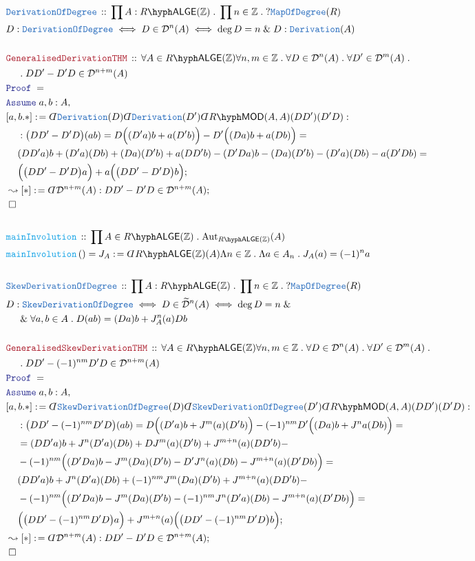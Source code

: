 \documentclass[12pt]{scrartcl}%
\newcommand{\TYPE}[1]{\textcolor{NavyBlue}{\mathtt{#1}}}%
\newcommand{\FUNC}[1]{\textcolor{Cerulean}{\mathtt{#1}}}%
\newcommand{\LOGIC}[1]{\textcolor{Blue}{\mathtt{#1}}}%
\newcommand{\THM}[1]{\textcolor{Maroon}{\mathtt{#1}}}%
\renewcommand{\.}{\; . \;} %
\newcommand{\de}{: \kern 0.1pc =} %
\newcommand{\Act}[1]{\left( #1 \right)} %
\newcommand{\Theorem}[2]{& \THM{#1} \, :: \, #2 \\ & \Proof = \\ } %
\newcommand{\DeclareType}[2]{& \TYPE{#1} \, :: \, #2 \\}%
\newcommand{\DefineNamedType}[4]{& #1 : \TYPE{#2} \iff #3 \iff #4 \\}%
\newcommand{\DeclareFunc}[2]{& \FUNC{#1} \, :: \, #2 \\}%
\newcommand{\DefineNamedFunc}[4]{&  \FUNC{#1}\Act{#2} = #3 \de #4 \\}%
\newcommand{\NewLine}{\\ & \kern 1pc}%
\newcommand{\Page}[1]{ \begin{align*} #1 \end{align*}  }%
\newcommand{ \bd }{ \ByDef }%
\renewcommand{\And}{\; \& \;}%
\newcommand{\Int}{\mathbb{Z}}%
\newcommand{\Aut}{\mathrm{Aut}}%
\newcommand{\Conclude}[3]{& #1 \de #2 : #3; \\}%
\newcommand{\DeriveConclude}[3]{& \leadsto #1 \de #2 : #3 ; \\} %
\newcommand{\Assume}[2]{& \LOGIC{Assume} \; #1 : #2, \\} %
\newcommand{\QED}{\; \square} %
\newcommand{\EndProof}{& \QED \\} %
\newcommand{\ByDef}{\rotatebox[origin=c]{-180}{$D$}}%
\newcommand{\Proof}{\LOGIC{Proof} \; } %
\newcommand{\D}{\mathcal{D}}
\newcommand{\LMOD}[1]{#1\hyph\mathsf{MOD}} %
\newcommand{\LALGE}[1]{#1\hyph\mathsf{ALGE}}%
\begin{document}
\Page{
	\DeclareType{DerivationOfDegree}{\prod A : \LALGE{R}(\Int) \. \prod n \in \Int \. ?\TYPE{MapOfDegree}(R)}
	\DefineNamedType{D}{DerivationOfDegree}{D \in \D^n(A)}{\deg D = n \And D : \TYPE{Derivation}(A)}
	\\
	\Theorem{GeneralisedDerivationTHM}{\forall A \in \LALGE{R}(\Int) \forall n,m \in \Int \. \forall D \in \D^n(A) \. \forall D' \in \D^m(A) \. 
		\NewLine \. DD' - D'D \in \D^{n+m}(A)}
	\Assume{a,b}{A}
	\Conclude{[a,b.*]}{\bd \TYPE{Derivation}(D)\bd \TYPE{Derivation}(D') \bd \LMOD{R}(A,A)(DD')(D'D)}
	{
		\NewLine :
		\big( DD' - D'D \big)(ab) =
		D\Big( (D'a)b + a(D'b)  \Big) - D'\Big( (Da)b + a(Db) \Big) = \NewLine
		(DD'a)b + (D'a)(Db)  + (Da)(D'b) + a(DD'b) - (D'Da)b - (Da)(D'b) - (D'a)(Db) - a(D'Db) = \NewLine 
		\Big(\big( DD' - D'D  \big)a\Big) + a\Big( \big( DD' - D'D \big)b \Big) 
	}
	\DeriveConclude{[*]}{\bd \D^{n + m}(A)}{DD' - D'D \in \D^{n+m}(A)}
	\EndProof
	\\
	\DeclareFunc{mainInvolution}{\prod A \in \LALGE{R}(\Int) \. \Aut_{\LALGE{R}(\Int)}(A)}
	\DefineNamedFunc{mainInvolution}{}{J_A}{\bd \LALGE{R}(\Int)(A)\Lambda n \in \Int \. \Lambda a \in A_n \. J_A(a) = (-1)^n a}
	\\
	\DeclareType{SkewDerivationOfDegree}{\prod A : \LALGE{R}(\Int) \. \prod n \in \Int \. ?\TYPE{MapOfDegree}(R)}
	\DefineNamedType{D}{SkewDerivationOfDegree}{D \in \widetilde{\D}^n(A)}{\deg D = n 
		\And  \NewLine \And   \forall a,b \in A \.   
		D(ab) = (Da)b  + J^n_A(a)Db
	}
	\\
	\Theorem{GeneralisedSkewDerivationTHM}{\forall A \in \LALGE{R}(\Int) \forall n,m \in \Int \. \forall D \in \D^n(A) \. \forall D' \in \D^m(A) \. 
		\NewLine \. DD' - (-1)^{nm}D'D \in \D^{n+m}(A)}
	\Assume{a,b}{A}
	\Conclude{[a,b.*]}{\bd \TYPE{SkewDerivationOfDegree}(D)\bd \TYPE{SkewDerivationOfDegree}(D') \bd \LMOD{R}(A,A)(DD')(D'D)}
	{
		\NewLine :
		\big( DD' - (-1)^{nm}D'D \big)(ab) =
		D\Big( (D'a)b + J^m(a)(D'b)  \Big) - (-1)^{nm}D'\Big( (Da)b + J^n{a}(Db) \Big) = \NewLine =
		(DD'a)b + J^n(D'a)(Db)  +  D J^{m}(a)(D'b) + J^{m + n}(a)(DD'b) -  \NewLine -
		(-1)^{nm}\Big( (D'Da)b -  J^{m}(Da)(D'b) -  D' J^n(a)(Db) - J^{m+n}(a)(D'Db) \Big)= \NewLine 
		(DD'a)b + J^n(D'a)(Db)  + (-1)^{nm} J^{m}( D a)(D'b) + J^{m + n}(a)(DD'b) -  \NewLine -
		(-1)^{nm}\Big( (D'Da)b -  J^{m}(Da)(D'b)  - (-1)^{nm}  J^n(D'a)(Db) - J^{m+n}(a)(D'Db) \Big)= \NewLine 
		\Big(\big( DD' - (-1)^{nm}D'D  \big)a\Big) + J^{m + n}(a)\Big( \big( DD' - (-1)^{nm}D'D \big)b \Big) 
	}
	\DeriveConclude{[*]}{\bd \D^{n + m}(A)}{DD' - D'D \in \D^{n+m}(A)}
	\EndProof
}
\newpage
\end{document}
